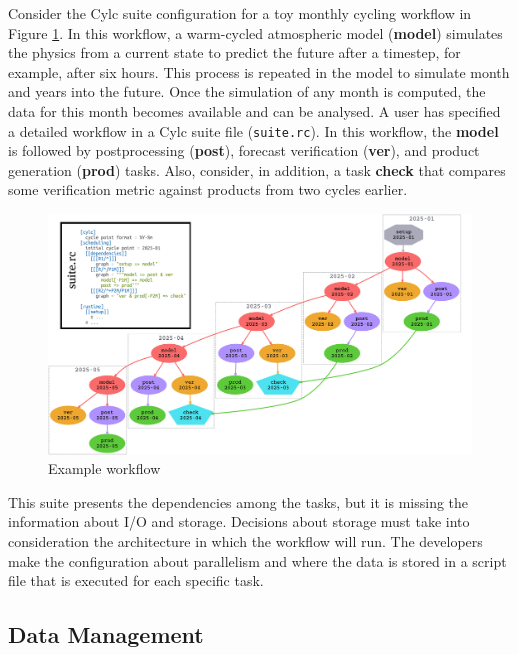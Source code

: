 \documentclass[a4paper]{article}
\begin{document}
Consider the Cylc suite configuration for a toy monthly cycling workflow in Figure \ref{fig:cylc}.
In this workflow, a warm-cycled atmospheric model (\textbf{model}) simulates the physics from a current state to predict the future after a timestep, for example, after six hours.
This process is repeated in the model to simulate month and years into the future.
Once the simulation of any month is computed, the data for this month becomes available and can be analysed.
A user has specified a detailed workflow in a Cylc suite file (\texttt{suite.rc}).
In this workflow, the \textbf{model} is followed by postprocessing (\textbf{post}), forecast verification (\textbf{ver}), and product generation (\textbf{prod}) tasks.
Also, consider, in addition, a task \textbf{check} that compares some verification metric against products from two cycles earlier.

\begin{figure}[H]
  \centering
  \includegraphics[width=0.9\columnwidth]{cylc1.png}
  \caption{Example workflow\cite{8675433}}
  \label{fig:cylc}
\end{figure}

This suite presents the dependencies among the tasks, but it is missing the information about I/O and storage.
Decisions about storage must take into consideration the architecture in which the workflow will run.
The developers make the configuration about parallelism and where the data is stored in a script file that is executed for each specific task.

\subsection{Data Management}
\end{document}
